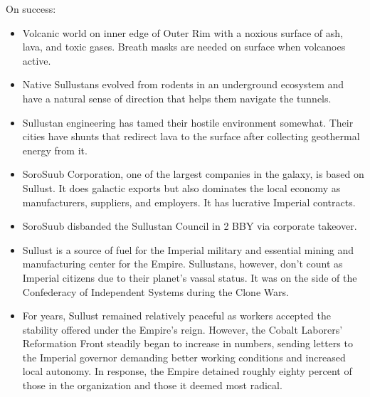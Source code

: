 \documentclass{book}
\begin{document}
\begin{multicols*}{2}
On success:
\begin{itemize}
    \item Volcanic world on inner edge of Outer Rim with a noxious surface of ash, lava, and toxic gases.  Breath masks are needed on surface when volcanoes active.
    \item Native Sullustans evolved from rodents in an underground ecosystem and have a natural sense of direction that helps them navigate the tunnels.
    \item \advantage  Sullustan engineering has tamed their hostile environment somewhat. Their cities have shunts that redirect lava to the surface after collecting geothermal energy from it.
   \item \advantage SoroSuub Corporation, one of the largest companies in the galaxy, is based on Sullust. It does galactic exports but also dominates the local economy as manufacturers, suppliers, and employers.  It has lucrative Imperial contracts.%
	\item \advantage SoroSuub disbanded the Sullustan Council in 2 BBY via corporate takeover.
    \item \advantage Sullust is a source of fuel for the Imperial military and essential mining and manufacturing center for the Empire.  Sullustans, however, don't count as Imperial citizens due to their planet's vassal status.  It was on the side of the Confederacy of Independent Systems during the Clone Wars.
    \item \advantage For years, Sullust remained relatively peaceful as workers accepted the stability offered under the Empire's reign. However, the Cobalt Laborers' Reformation Front steadily began to increase in numbers, sending letters to the Imperial governor demanding better working conditions and increased local autonomy. In response, the Empire detained roughly eighty percent of those in the organization and those it deemed most radical.

\end{itemize}
\end{multicols*}
\end{document}
